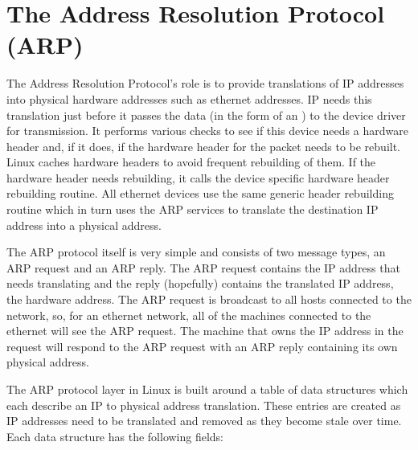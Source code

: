 \section{The Address Resolution Protocol (ARP)}
The Address Resolution Protocol's role is to provide translations of IP addresses into
physical hardware addresses such as ethernet addresses.
IP needs this translation just before it passes the data (in the form
of an ) to the device driver for transmission.
It performs various checks to see if this device needs a hardware header and, if it
does, if the hardware header for the packet needs to be rebuilt.
Linux caches hardware headers to avoid frequent rebuilding of them.
If the hardware header needs rebuilding, it calls the device specific hardware header rebuilding 
routine.
All ethernet devices use the same generic header rebuilding routine
which in turn uses the ARP services to translate the destination IP address into a physical
address.

The ARP protocol itself is very simple and consists of two message types, an ARP request and
an ARP reply.
The ARP request contains the IP address that needs translating and the reply (hopefully) 
contains the translated IP address, the hardware address.
The ARP request is broadcast to all hosts connected to the network, so, for an ethernet
network, all of the machines connected to the ethernet will see the ARP request.
The machine that owns the IP address in the request will respond to the ARP request with an
ARP reply containing its own physical address.

The ARP protocol layer in Linux is built around a table of  data structures which
each describe an IP to physical address translation.
These entries are created as IP addresses need to be translated and removed as they become stale
over time.
Each  data structure has the following fields:

